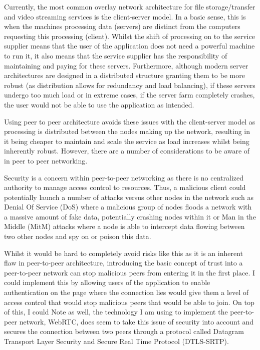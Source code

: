 \documentclass[]{report}
\begin{document}
			Currently, the most common overlay network architecture for file storage/transfer and video streaming services is the client-server model. In a basic sense, this is when the machines processing data (servers) are distinct from the computers requesting this processing (client). Whilst the shift of processing on to the service supplier means that the user of the application does not need a powerful machine to run it, it also means that the service supplier has the responsibility of maintaining and paying for these servers. Furthermore, although modern server architectures are designed in a distributed structure granting them to be more robust (as distribution allows for redundancy and load balancing), if these servers undergo too much load or in extreme cases, if the server farm completely crashes, the user would not be able to use the application as intended.
			
			Using peer to peer architecture avoids these issues with the client-server model as processing is distributed between the nodes making up the network, resulting in it being cheaper to maintain and scale the service as load increases whilst being inherently robust. However, there are a number of considerations to be aware of in peer to peer networking. 
			
			Security is a concern within peer-to-peer networking as there is no centralized authority to manage access control to resources. Thus, a malicious client could potentially launch a number of attacks versus other nodes in the network such as Denial Of Service (DoS) where a malicious group of nodes floods a network with a massive amount of fake data, potentially crashing nodes within it or Man in the Middle (MitM) attacks where a node is able to intercept data flowing between two other nodes and spy on or poison this data.\cite{P2P Security Issues}
			
			Whilst it would be hard to completely avoid risks like this as it is an inherent flaw in peer-to-peer architecture, introducing the basic concept of trust into a peer-to-peer network can stop malicious peers from entering it in the first place. I could implement this by allowing users of the application to enable authentication on the page where the connection lies would give them a level of access control that would stop malicious peers that would be able to join. On top of this, I could Note as well, the technology I am using to implement the peer-to-peer network, WebRTC, does seem to take this issue of security into account and secures the connection between two peers through a protocol called Datagram Transport Layer Security and Secure Real Time Protocol (DTLS-SRTP)\cite{WebRTC Security Study}.
		
\end{document}
